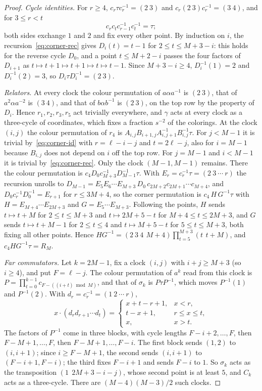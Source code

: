 \documentclass[11pt,a4paper]{article}
\theoremstyle{plain}
\theoremstyle{definition}
\theoremstyle{remark}
\begin{document}
\begin{proof}
\emph{Cycle identities.} For $r\ge4$, $c_r\tau c_r^{-1}=(2\ 3)$ and $c_r(2\ 3)c_r^{-1}=(3\ 4)$, and for $3\le r<t$
\begin{equation}\label{eq:corner-id}
c_rc_tc_{r-1}^{-1}c_t^{-1}=\tau ;
\end{equation}
both sides exchange $1$ and $2$ and fix every other point. By induction on $i$, the recursion~\eqref{eq:corner-rec} gives $D_i(t)=t-1$
for $2\le t\le M+3-i$: this holds for the reverse cycle $D_0$, and a point $t\le M+2-i$ passes the four factors of $D_{i+1}$ as
$t\mapsto t+1\mapsto t+1\mapsto t\mapsto t-1$. Since $M+3-i\ge4$, $D_i^{-1}(1)=2$ and $D_i^{-1}(2)=3$, so $D_i\tau D_i^{-1}=(2\ 3)$.

\emph{Relators.} At every clock the colour permutation of $a\alpha a^{-1}$ is $(2\ 3)$, that of $a^2\alpha a^{-2}$ is $(3\ 4)$, and that of
$b\alpha b^{-1}$ is $(2\ 3)$, on the top row by the property of $D_i$. Hence $r_1,r_2,r_3,r_5$ act trivially everywhere, and $\gamma$ acts at
every clock as a three-cycle of coordinates, which fixes a fraction $s^{-2}$ of the colorings. At the clock $(i,j)$ the colour
permutation of $r_4$ is $A_{i,j}B_{i+1,j}A_{i,j+1}^{-1}B_{i,j}^{-1}\tau$. For $j<M-1$ it is trivial by~\eqref{eq:corner-id} with
$r=\ell-i-j$ and $t=2\ell-j$, also for $i=M-1$ because $B_{i,j}$ does not depend on $i$ off the top row. For $j=M-1$ and $i<M-1$ it is
trivial by~\eqref{eq:corner-rec}. Only the clock $(M-1,M-1)$ remains. There the colour permutation is $c_4D_0c_{M+3}^{-1}D_{M-1}^{-1}\tau$. With
$E_r=c_r^{-1}\tau=(2\ 3\ \cdots\ r)$ the recursion unrolls to $D_{M-1}=E_5E_6\cdots E_{M+3}\,D_0\,c_{2M+2}c_{2M+1}\cdots c_{M+4}$, and
$D_0c_r^{-1}D_0^{-1}=E_{r+1}$ for $r\le3M+4$, so the corner permutation is $c_4\,H\,G^{-1}\tau$ with $H=E_{M+4}\cdots E_{2M+3}$ and
$G=E_5\cdots E_{M+3}$. Following the points, $H$ sends $t\mapsto t+M$ for $2\le t\le M+3$ and $t\mapsto2M+5-t$ for
$M+4\le t\le2M+3$, and $G$ sends $t\mapsto t+M-1$ for $2\le t\le4$ and $t\mapsto M+5-t$ for $5\le t\le M+3$, both fixing all other
points. Hence $HG^{-1}=(2\ 3\ 4\ \,M{+}4)\prod_{t=5}^{M+3}(t\ \,t{+}M)$, and $c_4HG^{-1}\tau=R_M$.

\emph{Far commutators.} Let $k=2M-1$, fix a clock $(i,j)$ with $i+j\ge M+3$ (so $i\ge4$), and put $F=\ell-j$. The colour permutation
of $a^k$ read from this clock is $P=\prod_{t=0}^{k-1}c_{F-((i+t)\bmod M)}$, and that of $\sigma_k$ is $P\tau P^{-1}$, which moves
$P^{-1}(1)$ and $P^{-1}(2)$. With $d_r=c_r^{-1}=(1\ 2\ \cdots\ r)$,
\[
x\cdot(d_rd_{r+1}\cdots d_t)=\begin{cases}x+t-r+1,&x<r,\\ t-x+1,&r\le x\le t,\\ x,&x>t.\end{cases}
\]
The factors of $P^{-1}$ come in three blocks, with cycle lengths $F-i+2,\dots,F$, then $F-M+1,\dots,F$, then $F-M+1,\dots,F-i$. The
first block sends $(1,2)$ to $(i,i+1)$; since $i\ge F-M+1$, the second sends $(i,i+1)$ to $(F-i+1,F-i)$; the third fixes $F-i+1$ and
sends $F-i$ to $1$. So $\sigma_k$ acts as the transposition $(1\ \ 2M+3-i-j)$, whose second point is at least $5$, and $C_k$ acts as
a three-cycle. There are $(M-4)(M-3)/2$ such clocks.


\end{proof}
\end{document}
